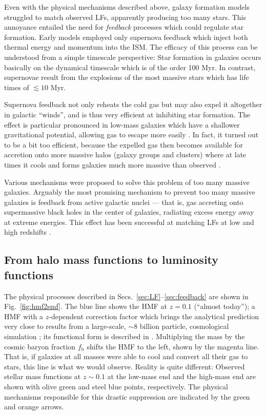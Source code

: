 \documentclass[useAMS,usenatbib,bibyear]{aa}
\begin{document}
Even with the physical mechanisms described above, galaxy formation models struggled to match observed LFs, apparently producing too many stars.
This annoyance entailed the need for \emph{feedback} processes which could regulate star formation.
Early models \citep[e.g.][]{White1991,Somerville1999,Efstathiou2000} employed only supernova feedback which inject both thermal energy and momentum into the ISM. 
The efficacy of this process can be understood from a simple timescale perspective:
Star formation in galaxies occurs basically on the dynamical timescale which is of the order 100 Myr. In contrast, supernovae result from the explosions of the most massive stars which has life times of $\lesssim 10$ Myr.

Supernova feedback not only reheats the cold gas but may also expel it altogether in galactic ``winds'', and is thus very efficient at inhibiting star formation. The effect is particular pronounced in low-mass galaxies which have a shallower gravitational potential, allowing gas to escape more easily \citep{Dekel1986,Kauffmann1993,Natarajan1999}.
In fact, it turned out to be a bit too efficient, because the expelled gas then becomes available for accretion onto more massive halos (galaxy groups and clusters) where at late times it cools and forms galaxies much more massive than observed \citep{Benson2003}.

Various mechanisms were proposed to solve this problem of too many massive galaxies.
Arguably the most promising mechanism to prevent too many massive galaxies is feedback from active galactic nuclei --- that is, gas accreting onto supermassive black holes in the center of galaxies, radiating excess energy away at extreme energies.
This effect has been successful at matching LFs at low and high redshifts \citep[e.g.][]{Croton2006,Bower2006,Somerville2008,Mccarthy2011}.

\subsection{From halo mass functions to luminosity functions}
\label{sec:hmf2smf}

The physical processes described in Secs.~\ref{sec:LF}--\ref{sec:feedback} are shown in Fig.~\ref{fig:hmf2smf}.
The blue line shows the HMF at $z=0.1$ (``almost today'');
a \citet{Sheth2002} HMF with a $z$-dependent correction factor which brings the analytical prediction very close to results from a large-scale, $\sim8$ billion particle, cosmological simulation \citep{Klypin2011};
its functional form is described in \citet{Laursen2019}.
Multiplying the mass by the cosmic baryon fraction $f_\mathrm{b}$ shifts the HMF to the left, shown by the magenta line.
That is, if galaxies at all masses were able to cool and convert all their gas to stars, this line is what we would observe.
Reality is quite different: Observed stellar mass functions at $z\sim0.1$ at the low-mass end \citep{Wright2017} and the high-mass end \citep{Bernardi2013} are shown with olive green and steel blue points, respectively.
The physical mechanisms responsible for this drastic suppression are indicated by the green and orange arrows.
\end{document}
